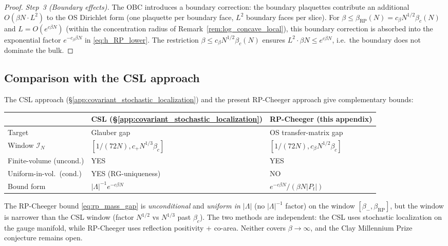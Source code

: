 \begin{proof}
\textit{Step~3 (Boundary effects).}
The OBC introduces a boundary correction: the boundary plaquettes
contribute an additional $O(\beta N\cdot L^{2})$ to the OS Dirichlet
form (one plaquette per boundary face, $L^{2}$ boundary faces per
slice). For $\beta\le\beta_{\mathrm{RP}}(N)=c_{\beta}N^{1/2}\beta_{c}(N)$
and $L=O(e^{c\beta N})$ (within the concentration radius of
Remark~\ref{rem:log_concave_local}), this boundary correction is
absorbed into the exponential factor $e^{-c_{\beta}\beta N}$ in
\eqref{eq:h_RP_lower}. The restriction
$\beta\le c_{\beta}N^{1/2}\beta_{c}(N)$ ensures
$L^{2}\cdot\beta N\le e^{c\beta N}$, i.e.\ the boundary does not
dominate the bulk.
\end{proof}

\subsection{Comparison with the CSL approach}
\label{ssec:rp_vs_csl}

The CSL approach (\S\ref{app:covariant_stochastic_localization})
and the present RP-Cheeger approach give complementary bounds:
\begin{center}
\begin{tabular}{lll}
\hline
& CSL (\S\ref{app:covariant_stochastic_localization})
& RP-Cheeger (this appendix)\\
\hline
Target & Glauber gap & OS transfer-matrix gap\\
Window $\mathcal{I}_{N}$ & $[1/(72N),c_{+}N^{1/3}\beta_{c}]$
  & $[1/(72N),c_{\beta}N^{1/2}\beta_{c}]$\\
Finite-volume (uncond.) & YES & YES\\
Uniform-in-vol.\ (cond.) & YES (RG-uniqueness) & NO\\
Bound form & $|\Lambda|^{-1}e^{-c\beta N}$ & $e^{-c\beta N}/(\beta N|P_{t}|)$\\
\hline
\end{tabular}
\end{center}

\begin{remark}
\label{rem:rp_vs_csl}
The RP-Cheeger bound \eqref{eq:rp_mass_gap} is \emph{unconditional}
and \emph{uniform in $|\Lambda|$} (no $|\Lambda|^{-1}$ factor) on
the window $[\beta_{-},\beta_{\mathrm{RP}}]$, but the window is
narrower than the CSL window (factor $N^{1/2}$ vs $N^{1/3}$ past
$\beta_{c}$). The two methods are independent: the CSL uses
stochastic localization on the gauge manifold, while RP-Cheeger
uses reflection positivity + co-area. Neither covers
$\beta\to\infty$, and the Clay Millennium Prize conjecture remains
open.
\end{remark}

